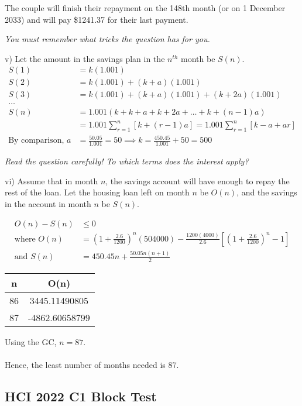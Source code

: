 \documentclass[12pt, a4paper, titlepage]{article}
\begin{document}
The couple will finish their repayment on the 148th month (or on 1 December 2033) and will pay \$1241.37 for their last payment.

\emph{You must remember what tricks the question has for you.}

v)
Let the amount in the savings plan in the $n^{th}$ month be $S(n)$.
\begin{align*}
    S(1) &= k(1.001) \\
    S(2) &= k(1.001) + (k + a)(1.001) \\
    S(3) &= k(1.001) + (k + a)(1.001) + (k + 2a)(1.001) \\
    \dots \\
    S(n) &= 1.001(k + k + a + k + 2a + \dots + k + (n - 1)a) \\
    &= 1.001 \sum_{r = 1}^{n} [k + (r - 1)a] = 1.001 \sum_{r = 1}^{n} [k - a + ar] \\
    \text{By comparison, } a &= \frac{50.05}{1.001} = 50 \implies k = \frac{450.45}{1.001} + 50 = 500
\end{align*}

\emph{Read the question carefully! To which terms does the interest apply?}

vi)
Assume that in month $n$, the savings account will have enough to repay the rest of the loan.
Let the housing loan left on month $n$ be $O(n)$, and the savings in the account in month $n$ be $S(n)$.

\begin{align*}
    O(n) - S(n) &\leq 0 \\
    \text{where } O(n) &= (1 + \frac{2.6}{1200})^n(504000) - \frac{1200(4000)}{2.6}[(1 + \frac{2.6}{1200})^n - 1] \\
    \text{and } S(n) &= 450.45n + \frac{50.05n(n + 1)}{2}
\end{align*}

\begin{minipage}{0.4\textwidth}
    \begin{tabular}{c|c}
        n & O(n) \\
        \hline
        86 & 3445.11490805 \\
        \hline
        87 & -4862.60658799 \\
    \end{tabular}
\end{minipage}
Using the GC, $n = 87$. \\ \\
Hence, the least number of months needed is 87.

\subsection{HCI 2022 C1 Block Test}
\end{document}
